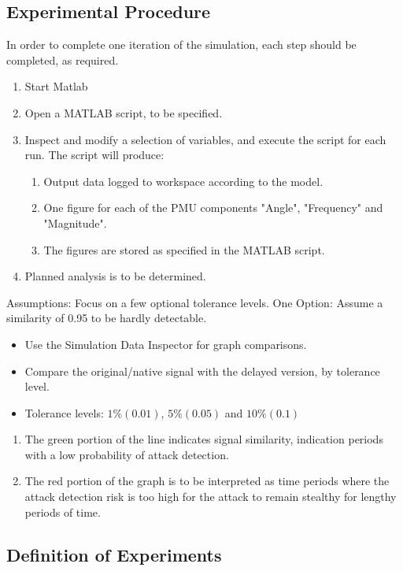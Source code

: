 \subsection{Experimental Procedure}
In order to complete one iteration of the simulation, each step should be completed, as required.
\begin{enumerate}
    \item Start Matlab
    \item Open a MATLAB script, to be specified.
    \item Inspect and modify a selection of variables, and execute the script for each run. The script will produce:
    \begin{enumerate}
    \item Output data logged to workspace according to the model.
    \item One figure for each of the PMU components "Angle", "Frequency" and "Magnitude".
    \item The figures are stored as specified in the MATLAB script.
    \end{enumerate}
    \item Planned analysis is to be determined. 
\end{enumerate}
Assumptions: 
Focus on a few optional tolerance levels. One Option: Assume a similarity of 0.95 to be hardly detectable.  
\begin{itemize}
    \item Use the Simulation Data Inspector for graph comparisons.
    \item Compare the original/native signal with the delayed version, by tolerance level.
    \item Tolerance levels: $1\% (0.01)$, $5\% (0.05)$ and $10\% (0.1)$ 
\end{itemize}

\begin{enumerate}
    \item The green portion of the line indicates signal similarity, indication periods with a low probability of attack detection.
    \item The red portion of the graph is to be interpreted as time periods where the attack detection risk is too high for the attack to remain stealthy for lengthy periods of time.

\end{enumerate}
\subsection{Definition of Experiments} \label{sec:ExpDef}

